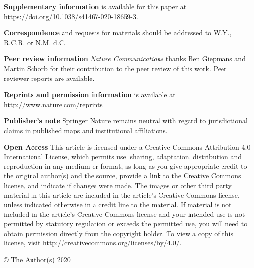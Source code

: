 \documentclass{article}
\begin{document}
{\small
\noindent\textbf{Supplementary information} is available for this paper at https://doi.org/10.1038/s41467-020-18659-3.

\noindent\textbf{Correspondence} and requests for materials should be addressed to W.Y., R.C.R. or N.M. d.C.

\noindent\textbf{Peer review information} \emph{Nature Communications} thanks Ben Giepmans and Martin Schorb for their contribution to the peer review of this work. Peer reviewer reports are available.

\noindent\textbf{Reprints and permission information} is available at http://www.nature.com/reprints

\noindent\textbf{Publisher’s note} Springer Nature remains neutral with regard to jurisdictional claims in published maps and institutional affiliations.

\noindent\textbf{Open Access} This article is licensed under a Creative Commons Attribution 4.0 International License, which permits use, sharing, adaptation, distribution and reproduction in any medium or format, as long as you give appropriate credit to the original author(s) and the source, provide a link to the Creative Commons license, and indicate if changes were made. The images or other third party material in this article are included in the article’s Creative Commons license, unless indicated otherwise in a credit line to the material. If material is not included in the article’s Creative Commons license and your intended use is not permitted by statutory regulation or exceeds the permitted use, you will need to obtain permission directly from the copyright holder. To view a copy of this license, visit http://creativecommons.org/licenses/by/4.0/.

\noindent © The Author(s) 2020
}
\end{document}

